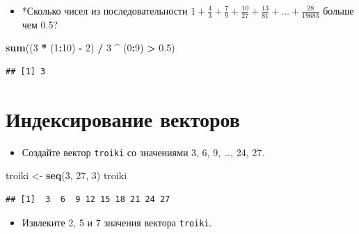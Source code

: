 \documentclass[]{book}
\newenvironment{Shaded}{\begin{snugshade}}{\end{snugshade}}
\newcommand{\KeywordTok}[1]{\textcolor[rgb]{0.13,0.29,0.53}{\textbf{#1}}}
\newcommand{\DecValTok}[1]{\textcolor[rgb]{0.00,0.00,0.81}{#1}}
\newcommand{\FloatTok}[1]{\textcolor[rgb]{0.00,0.00,0.81}{#1}}
\newcommand{\StringTok}[1]{\textcolor[rgb]{0.31,0.60,0.02}{#1}}
\newcommand{\OperatorTok}[1]{\textcolor[rgb]{0.81,0.36,0.00}{\textbf{#1}}}
\newcommand{\NormalTok}[1]{#1}
\providecommand{\tightlist}{%
  \setlength{\itemsep}{0pt}\setlength{\parskip}{0pt}}
\begin{document}
\begin{itemize}
\tightlist
\item
  *Сколько чисел из последовательности
  \(1+\frac{4}{3}+\frac{7}{9}+\frac{10}{27}+\frac{13}{81}+\ldots+\frac{28}{19683}\)
  больше чем 0.5?
\end{itemize}

\begin{Shaded}
\begin{Highlighting}[]
\KeywordTok{sum}\NormalTok{((}\DecValTok{3} \OperatorTok{*}\StringTok{ }\NormalTok{(}\DecValTok{1}\OperatorTok{:}\DecValTok{10}\NormalTok{) }\OperatorTok{-}\StringTok{ }\DecValTok{2}\NormalTok{) }\OperatorTok{/}\StringTok{ }\DecValTok{3} \OperatorTok{^}\StringTok{ }\NormalTok{(}\DecValTok{0}\OperatorTok{:}\DecValTok{9}\NormalTok{) }\OperatorTok{>}\StringTok{ }\FloatTok{0.5}\NormalTok{)}
\end{Highlighting}
\end{Shaded}

\begin{verbatim}
## [1] 3
\end{verbatim}

\section{Индексирование векторов}\label{solution_vec_ind}

\begin{itemize}
\tightlist
\item
  Создайте вектор \texttt{troiki} со значениями 3, 6, 9, \ldots{}, 24,
  27.
\end{itemize}

\begin{Shaded}
\begin{Highlighting}[]
\NormalTok{troiki <-}\StringTok{ }\KeywordTok{seq}\NormalTok{(}\DecValTok{3}\NormalTok{, }\DecValTok{27}\NormalTok{, }\DecValTok{3}\NormalTok{)}
\NormalTok{troiki}
\end{Highlighting}
\end{Shaded}

\begin{verbatim}
## [1]  3  6  9 12 15 18 21 24 27
\end{verbatim}

\begin{itemize}
\tightlist
\item
  Извлеките 2, 5 и 7 значения вектора \texttt{troiki}.
\end{itemize}
\end{document}
